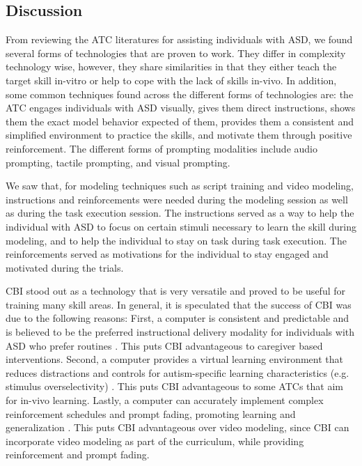 \subsection{Discussion}
\label{Sec:AT4ASDDiscussion}
From reviewing the ATC literatures for assisting individuals with ASD, we found several forms of technologies that are proven to work.  They differ in complexity technology wise, however, they share similarities in that they either teach the target skill in-vitro or help to cope with the lack of skills in-vivo.  In addition, some common techniques found across the different forms of technologies are: the ATC engages individuals with ASD visually, gives them direct instructions, shows them the exact model behavior expected of them, provides them a consistent and simplified environment to practice the skills, and motivate them through positive reinforcement.  The different forms of prompting modalities include audio prompting, tactile prompting, and visual prompting.

We saw that, for modeling techniques such as script training and video modeling, instructions and reinforcements were needed during the modeling session as well as during the task execution session.  The instructions served as a way to help the individual with ASD to focus on certain stimuli necessary to learn the skill during modeling, and to help the individual to stay on task during task execution.  The reinforcements served as motivations for the individual to stay engaged and motivated during the trials.

CBI stood out as a technology that is very versatile and proved to be useful for training many skill areas.  In general, it is speculated that the success of CBI was due to the following reasons: First, a computer is consistent and predictable and is believed to be the preferred instructional delivery modality for individuals with ASD who prefer routines \cite{ramdoss2011use}.  This puts CBI advantageous to caregiver based interventions.  Second, a computer provides a virtual learning environment that reduces distractions and controls for autism-specific learning characteristics (e.g. stimulus overselectivity) \cite{lovaas1979stimulus}.  This puts CBI advantageous to some ATCs that aim for in-vivo learning.  Lastly, a computer can accurately implement complex reinforcement schedules and prompt fading, promoting learning and generalization \cite{ramdoss2011useb}.  This puts CBI advantageous over video modeling, since CBI can incorporate video modeling as part of the curriculum, while providing reinforcement and prompt fading.

